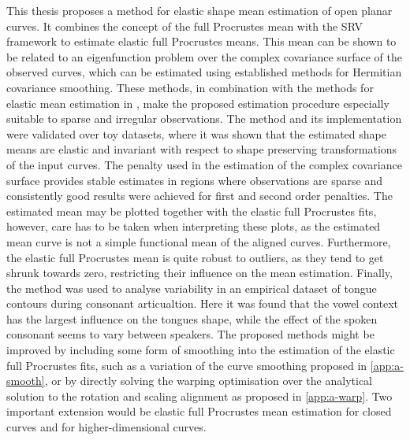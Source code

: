 \label{sec:5}
This thesis proposes a method for elastic shape mean estimation of open planar
curves. 
It combines the concept of the full Procrustes mean with the SRV framework to
estimate elastic full Procrustes means.  
This mean can be shown to be related to an eigenfunction problem over the
complex covariance surface of the observed curves, which can be estimated using
established methods for Hermitian covariance smoothing.  
These methods, in combination with the methods for elastic mean estimation in
\cite{Steyer2021}, make the proposed estimation procedure especially suitable to
sparse and irregular observations.
The method and its implementation were validated over toy datasets, where it was
shown that the estimated shape means are elastic and invariant with respect to
shape preserving transformations of the input curves.
The penalty used in the estimation of the complex covariance
surface provides stable estimates in regions where observations are sparse and
consistently  good results were achieved for first and second order penalties.
The estimated mean may be plotted together with the elastic full Procrustes
fits, however, care has to be taken when interpreting these plots, as the
estimated mean curve is not a simple functional mean of the aligned curves.
Furthermore, the elastic full Procrustes mean is quite robust to
outliers, as they tend to get shrunk towards zero, restricting their influence
on the mean estimation.
Finally, the method was used to analyse variability in an empirical dataset of
tongue contours during consonant articualtion.
Here it was found that the vowel context has the largest influence on the tongues
shape, while the effect of the spoken consonant seems to vary between speakers.
The proposed methods might be improved by including some form of smoothing into
the estimation of the elastic full Procrustes fits, such as a variation of the
curve smoothing proposed in \cref{app:a-smooth}, or by directly solving the
warping optimisation over the analytical solution to the rotation and scaling
alignment as proposed in \cref{app:a-warp}.
Two important extension would be elastic full Procrustes mean estimation for
closed curves and for higher-dimensional curves.
